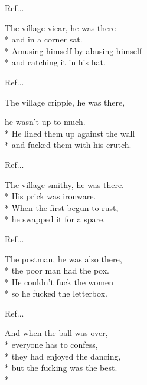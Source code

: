 \begin{SongText}
\begin{SongVerse}
    \end{SongVerse}
    \begin{SongVerse}
        Ref...
    \end{SongVerse}
    \begin{SongVerse}
        The village vicar, he was there\\*%
        and in a corner sat.\\*%
        Amusing himself by abusing himself\\*%
        and catching it in his hat.
    \end{SongVerse}
    \begin{SongVerse}
        Ref...
    \end{SongVerse}
    \begin{SongVerse}
        The village cripple, he was there,
    \end{SongVerse}
    \begin{SongVerse}
        he wasn't up to much.\\*%
        He lined them up against the wall\\*%
        and fucked them with his crutch.
    \end{SongVerse}
    \begin{SongVerse}
        Ref...
    \end{SongVerse}
    \begin{SongVerse}
        The village smithy, he was there.\\*%
        His prick was ironware.\\*%
        When the first begun to rust,\\*%
        he swapped it for a spare.
    \end{SongVerse}
    \begin{SongVerse}
        Ref...
    \end{SongVerse}
    \begin{SongVerse}
        The postman, he was also there,\\*%
        the poor man had the pox.\\*%
        He couldn't fuck the women\\*%
        so he fucked the letterbox.
    \end{SongVerse}
    \begin{SongVerse}
        Ref...
    \end{SongVerse}
    \begin{SongVerse}
        And when the ball was over,\\*%
        everyone has to confess,\\*%
        they had enjoyed the dancing,\\*%
        but the fucking was the best. \\*%
    \end{SongVerse}
\end{SongText}
